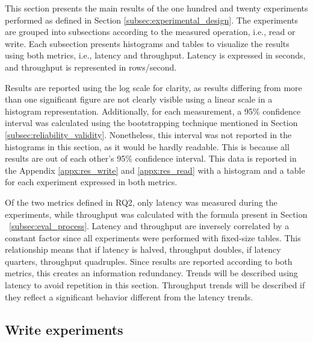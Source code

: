 This section presents the main results of the one hundred and twenty experiments performed as defined in Section \ref{subsec:experimental_design}. The experiments are grouped into subsections according to the measured operation, i.e., read or write. Each subsection presents histograms and tables to visualize the results using both metrics, i.e., latency and throughput. Latency is expressed in seconds, and throughput is represented in rows/second.

Results are reported using the log scale for clarity, as results differing from more than one significant figure are not clearly visible using a linear scale in a histogram representation. Additionally, for each measurement, a 95\% confidence interval was calculated using the bootstrapping technique mentioned in Section \ref{subsec:reliability_validity}. Nonetheless, this interval was not reported in the histograms in this section, as it would be hardly readable. This is because all results are out of each other's 95\% confidence interval. This data is reported in the Appendix \ref{appx:res_write} and \ref{appx:res_read} with a histogram and a table for each experiment expressed in both metrics.

Of the two metrics defined in RQ2, only latency was measured during the experiments, while throughput was calculated with the formula present in Section ~\ref{subsec:eval_process}. Latency and throughput are inversely correlated by a constant factor since all experiments were performed with fixed-size tables. This relationship means that if latency is halved, throughput doubles, if latency quarters, throughput quadruples. Since results are reported according to both metrics, this creates an information redundancy. Trends will be described using latency to avoid repetition in this section. Throughput trends will be described if they reflect a significant behavior different from the latency trends.

\subsection{Write experiments}


